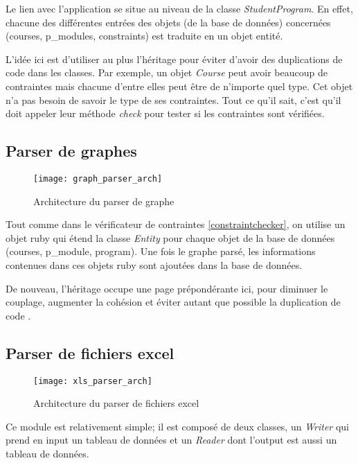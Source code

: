Le lien avec l'application se situe au niveau de la classe \textit{StudentProgram}. En effet, chacune des différentes entrées des objets (de la base de données) concernées (courses, p\_modules, constraints) est traduite en un objet entité.

L'idée ici est d'utiliser au plus l'héritage pour éviter d'avoir des duplications de code dans les classes. Par exemple, un objet \textit{Course} peut avoir beaucoup de contraintes mais chacune d’entre elles peut être de n'importe quel type. Cet objet n'a pas besoin de savoir le type de ses contraintes. Tout ce qu'il sait, c'est qu'il doit appeler leur méthode \textit{check} pour tester si les contraintes sont vérifiées. 


\subsection{Parser de graphes}

\begin{figure}[H]
\centering
\caption{Architecture du parser de graphe}
\label{fig:graph_parser_arch}
\texttt{[image: graph\_parser\_arch]}
\end{figure}



Tout comme dans le vérificateur de contraintes \ref{constraintchecker}, on utilise un objet ruby qui étend la classe \textit{Entity} pour chaque objet de la base de données (courses, p\_module, program). Une fois le graphe parsé, les informations contenues dans ces objets ruby sont ajoutées dans la base de données. 

De nouveau, l'héritage occupe une page prépondérante ici, pour diminuer le couplage, augmenter la cohésion  et éviter autant que possible la duplication de code \cite{cohesion_couplage}. 

\subsection{Parser de fichiers excel}
\label{xls_parser}
\begin{figure}[H]
\centering
\caption{Architecture du parser de fichiers excel}
\label{xls_parser_arch}
\texttt{[image: xls\_parser\_arch]}
\end{figure}

Ce module est relativement simple; il est composé de deux classes, un \textit{Writer} qui prend en input un tableau de données et un \textit{Reader} dont l'output est aussi un tableau de données.


